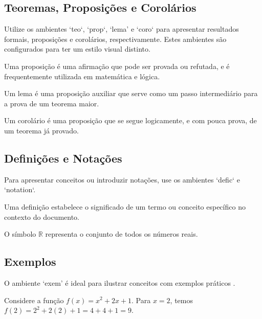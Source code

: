 \subsection{Teoremas, Proposições e Corolários}
Utilize os ambientes `teo`, `prop`, `lema' e `coro` para apresentar resultados formais, proposições e corolários, respectivamente. Estes ambientes são configurados para ter um estilo visual distinto.

\begin{prop}
Uma proposição é uma afirmação que pode ser provada ou refutada, e é frequentemente utilizada em matemática e lógica.
\end{prop}

\begin{lema}
Um lema é uma proposição auxiliar que serve como um passo intermediário para a prova de um teorema maior.
\end{lema}

\begin{coro}
Um corolário é uma proposição que se segue logicamente, e com pouca prova, de um teorema já provado.
\end{coro}

\subsection{Definições e Notações}
Para apresentar conceitos ou introduzir notações, use os ambientes `defic` e `notation`.

\begin{defic}
Uma definição estabelece o significado de um termo ou conceito específico no contexto do documento.
\end{defic}

\begin{notation}
O símbolo $\mathbb{R}$ representa o conjunto de todos os números reais.
\end{notation}

\subsection{Exemplos}
O ambiente `exem' é ideal para ilustrar conceitos com exemplos práticos .

\begin{exem}
Considere a função $f(x) = x^2 + 2x + 1$. Para $x=2$, temos $f(2) = 2^2 + 2(2) + 1 = 4 + 4 + 1 = 9$.
\end{exem}

